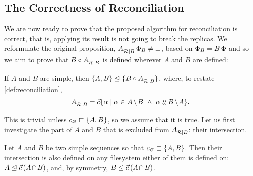 
\subsection{The Correctness of Reconciliation}

We are now ready to prove that the proposed algorithm for reconciliation is correct,
that is, applying its result is not going to break the replicas.
We reformulate the original proposition, ${A}^{}_{\mathcal{R}|{B}}\,\Phi_B\neq\bot$,
based on $\Phi_B=B\,\Phi$ and so we aim to prove that
$B\circ{A}^{}_{\mathcal{R}|{B}}$ is defined wherever $A$ and $B$ are defined:

\begin{myth}\label{reconciliation_correct}
If $A$ and $B$ are simple, then ${\{{A,B}\}}\trianglelefteq{\{{B\circ{A}^{}_{\mathcal{R}|{B}}}\}}$,
where, to restate \cref{def:reconciliation},
\[ \reca = \ords{\alpha \whr \alpha\in \ambnp  \ \wedge\   \alpha\indep \bmanp }. \]
\end{myth}

This is trivial unless $c_\varnothing\sqsubset{\{{A,B}\}}$, so we assume that it is true.
Let us first investigate the part of $A$ and $B$ that is excluded from
${A}^{}_{\mathcal{R}|{B}}$: their intersection.

\begin{mylem}\label{can_move_intersection}
Let $A$ and $B$ be two simple sequences so that $c_\varnothing\sqsubset{\{{A, B}\}}$.
Then their intersection is also defined on any filesystem
either of them is defined on:
$\worksm{A}{\ordp{\acbnp}}$, and, by symmetry,
$\worksm{B}{\ordp{\acbnp}}$.
\end{mylem}

